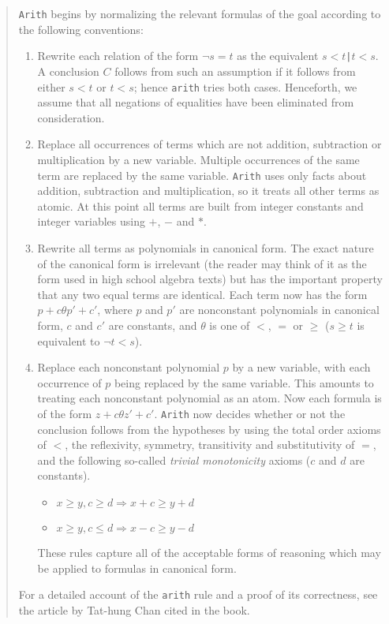 \begin{quote}
{\tt Arith} begins by normalizing the relevant formulas of the goal according to
the following conventions:
\begin {enumerate}
  \item Rewrite each relation of the form {\tt $\neg s=t$} as the
  equivalent {\tt $s<t$|$t<s$}.  
  A conclusion $C$ follows from such an
  assumption if it follows from either $s<t$ or $t<s$; hence {\tt arith}
  tries both cases.
  Henceforth, we assume that all negations of equalities have been
  eliminated from consideration.
  \item Replace all occurrences of terms which are not addition, subtraction
  or multiplication by a new variable.
  Multiple occurrences of the same term are replaced by the same variable.
  {\tt Arith} uses only facts about addition, subtraction and multiplication,
  so it
  treats all other terms as atomic.
  At this point all terms are built from integer constants and integer
  variables using $+$, $-$ and $\ast$.
  \item Rewrite all terms as polynomials
  in canonical form.  The exact
  nature of the canonical form is irrelevant (the reader may think
  of it as the form used in high school algebra texts) but has the
  important property that any two equal terms are identical.
  Each term now has the form $p+c \theta p'+c'$, where $p$ and $p'$
  are nonconstant polynomials in
  canonical form, $c$ and $c'$ are
  constants, and $\theta$ is one of $<$, $=$ or $\geq$ ($s \geq t$ is
  equivalent to $\neg t < s$).
  \item  Replace each nonconstant polynomial $p$ by a new variable,
  with each occurrence of $p$ being replaced by the same variable.
  This amounts to treating each nonconstant polynomial as an atom.
  Now each formula is of the form $z+c \theta z'+c'$.
  {\tt Arith} now decides whether or not the conclusion follows from the hypotheses
  by using the total order axioms of $<$, the reflexivity, symmetry,
  transitivity and substitutivity of $=$, and the following so-called
  {\it trivial monotonicity} axioms ($c$ and $d$
  are constants).
  \begin{itemize}
    \item $x \geq y, c \geq d \Rightarrow x+c \geq y+d$
    \item $x \geq y, c \leq d \Rightarrow x-c \geq y-d$
  \end{itemize}
  These rules capture all of the acceptable forms of reasoning which may be
  applied to formulas in canonical form.
\end{enumerate}

For a detailed account of the {\tt arith} rule 
and a proof of its correctness, see
the article by Tat-hung Chan cited in the book.
\end{quote}



